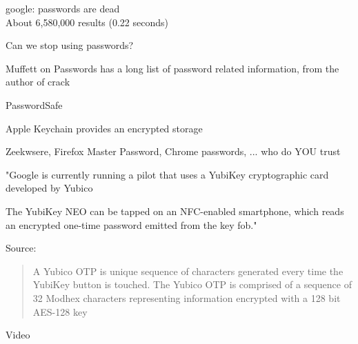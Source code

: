 \documentclass[20pt,landscape,a4paper,footrule]{foils}
\begin{document}

google: passwords are dead\\
About 6,580,000 results (0.22 seconds)


Can we stop using passwords?

Muffett on Passwords has a long list of password related information, from the author of crack 





\begin{list1}
\item PasswordSafe 
\item Apple Keychain provides an encrypted storage
\item Zeekwsere, Firefox Master Password, Chrome passwords, ... who do YOU trust
\end{list1}




"Google is currently running a pilot that uses a YubiKey cryptographic card developed by Yubico

The YubiKey NEO can be tapped on an NFC-enabled smartphone, which reads an encrypted one-time password emitted from the key fob."

{\footnotesize Source:
}


\begin{quote}
A Yubico OTP is unique sequence of characters generated every time the YubiKey button is touched. The Yubico OTP is comprised of a sequence of 32 Modhex characters representing information encrypted with a 128 bit AES-128 key
\end{quote}



Video
\end{document}
